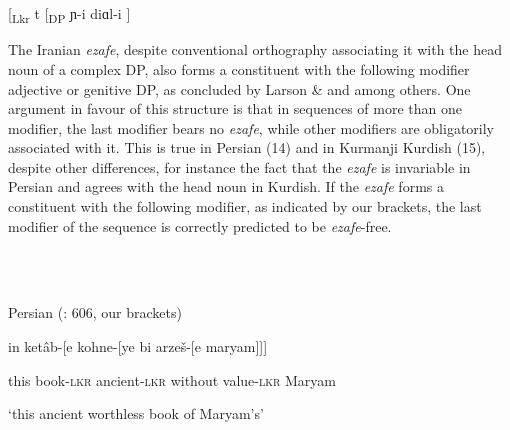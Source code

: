 \documentclass[output=paper]{langsci/langscibook}
\begin{document}
\begin{styleSfondomedioiColorexxi}
\ea%
    \label{ex:key:13}
    \gll\\
        \\
    \glt
    \z

            [\textsubscript{Lkr} t  [\textsubscript{DP} ɲ-i diɑl-i ]     
\end{styleSfondomedioiColorexxi}

\begin{styleSfondomedioiColorexxi}
The Iranian \textit{ezafe}, despite conventional orthography associating it with the head noun of a complex DP, also forms a constituent with the following modifier adjective or genitive DP, as concluded by Larson \& \citet{Yamakido2008} and \citet{Philip2012} among others. One argument in favour of this structure is that in sequences of more than one modifier, the last modifier bears no \textit{ezafe}, while other modifiers are obligatorily associated with it. This is true in Persian (14) and in Kurmanji Kurdish (15), despite other differences, for instance the fact that the \textit{ezafe} is invariable in Persian and agrees with the head noun in Kurdish. If the \textit{ezafe} forms a constituent with the following modifier, as indicated by our brackets, the last modifier of the sequence is correctly predicted to be \textit{ezafe}{}-free. 
\end{styleSfondomedioiColorexxi}

\begin{styleSfondomedioiColorexxi}
\ea%
    \label{ex:key:14}
    \gll\\
        \\
    \glt
    \z

          Persian (\citealt{Samvelian2007}: 606, our brackets)
\end{styleSfondomedioiColorexxi}

\begin{styleSfondomedioiColorexxi}
in   ketâb-[e   kohne-[ye   bi arzeš-[e     maryam]]]
\end{styleSfondomedioiColorexxi}

\begin{styleSfondomedioiColorexxi}
  this   book{}-\textsc{lkr}    ancient{}-\textsc{lkr}    without value{}-\textsc{lkr}    Maryam
\end{styleSfondomedioiColorexxi}

\begin{styleSfondomedioiColorexxi}
  ‘this ancient worthless book of Maryam’s’     
\end{styleSfondomedioiColorexxi}
\end{document}
